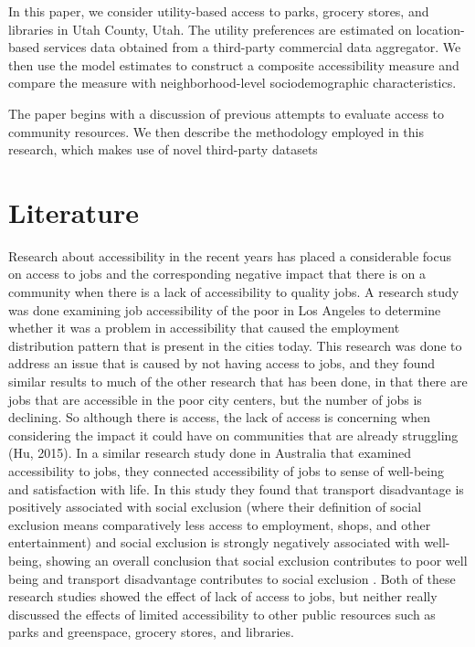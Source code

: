 \documentclass[3p, authoryear]{elsarticle} %
\begin{document}
In this paper, we consider utility-based access to parks, grocery stores, and
libraries in Utah County, Utah. The utility preferences are estimated on
location-based services data obtained from a third-party commercial data
aggregator. We then use the model estimates to construct a composite
accessibility measure and compare the measure with neighborhood-level
sociodemographic characteristics.

The paper begins with a discussion of previous attempts to evaluate
access to community resources. We then describe the methodology employed in
this research, which makes use of novel third-party datasets

\hypertarget{lit-review}{%
\section{Literature}\label{lit-review}}

Research about accessibility in the recent years has placed a considerable focus
on access to jobs and the corresponding negative impact that there is on a
community when there is a lack of accessibility to quality jobs. A research
study was done examining job accessibility of the poor in Los Angeles to
determine whether it was a problem in accessibility that caused the employment
distribution pattern that is present in the cities today. This research was done
to address an issue that is caused by not having access to jobs, and they found
similar results to much of the other research that has been done, in that there
are jobs that are accessible in the poor city centers, but the number of jobs is
declining. So although there is access, the lack of access is concerning when
considering the impact it could have on communities that are already struggling
(Hu, 2015). In a similar research study done in Australia that examined
accessibility to jobs, they connected accessibility of jobs to sense of
well-being and satisfaction with life. In this study they found that transport
disadvantage is positively associated with social exclusion (where their
definition of social exclusion means comparatively less access to employment,
shops, and other entertainment) and social exclusion is strongly negatively
associated with well-being, showing an overall conclusion that social exclusion
contributes to poor well being and transport disadvantage contributes to social
exclusion \citep{currie2010modeling}. Both of these research studies showed the
effect of lack of access to jobs, but neither really discussed the effects of
limited accessibility to other public resources such as parks and greenspace,
grocery stores, and libraries.
\end{document}

